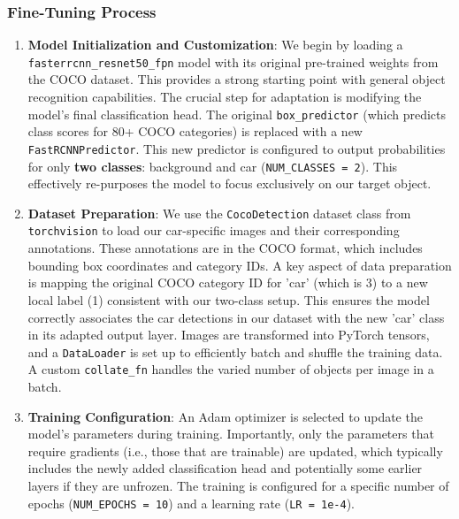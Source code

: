 \documentclass[conference]{IEEEtran}
\begin{document}
\subsubsection{Fine-Tuning Process}

\begin{enumerate}
    \item \textbf{Model Initialization and Customization}:
    We begin by loading a \texttt{fasterrcnn\_resnet50\_fpn} model with its original pre-trained weights from the COCO dataset. This provides a strong starting point with general object recognition capabilities. The crucial step for adaptation is modifying the model's final classification head. The original \texttt{box\_predictor} (which predicts class scores for 80+ COCO categories) is replaced with a new \texttt{FastRCNNPredictor}. This new predictor is configured to output probabilities for only \textbf{two classes}: background and car (\texttt{NUM\_CLASSES = 2}). This effectively re-purposes the model to focus exclusively on our target object.

    \item \textbf{Dataset Preparation}:
    We use the \texttt{CocoDetection} dataset class from \texttt{torchvision} to load our car-specific images and their corresponding annotations. These annotations are in the COCO format, which includes bounding box coordinates and category IDs. A key aspect of data preparation is mapping the original COCO category ID for 'car' (which is 3) to a new local label (1) consistent with our two-class setup. This ensures the model correctly associates the car detections in our dataset with the new 'car' class in its adapted output layer. Images are transformed into PyTorch tensors, and a \texttt{DataLoader} is set up to efficiently batch and shuffle the training data. A custom \texttt{collate\_fn} handles the varied number of objects per image in a batch.

    \item \textbf{Training Configuration}:
    An Adam optimizer is selected to update the model's parameters during training. Importantly, only the parameters that require gradients (i.e., those that are trainable) are updated, which typically includes the newly added classification head and potentially some earlier layers if they are unfrozen. The training is configured for a specific number of epochs (\texttt{NUM\_EPOCHS = 10}) and a learning rate (\texttt{LR = 1e-4}).


\end{enumerate}
\end{document}

